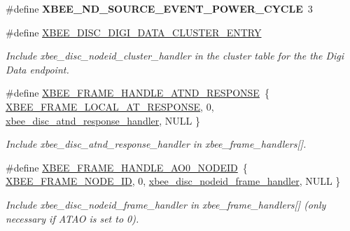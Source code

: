 \begin{DoxyCompactItemize}
\item 
\mbox{\label{group__xbee__discovery_ga0e1a51031fe5f18aa5b2c5ad02bbb329}} 
\#define {\bfseries X\+B\+E\+E\+\_\+\+N\+D\+\_\+\+S\+O\+U\+R\+C\+E\+\_\+\+E\+V\+E\+N\+T\+\_\+\+P\+O\+W\+E\+R\+\_\+\+C\+Y\+C\+LE}~3
\item 
\#define \hyperlink{group__xbee__discovery_ga8f678e29b22812632df7d3fa3d0f951a}{X\+B\+E\+E\+\_\+\+D\+I\+S\+C\+\_\+\+D\+I\+G\+I\+\_\+\+D\+A\+T\+A\+\_\+\+C\+L\+U\+S\+T\+E\+R\+\_\+\+E\+N\+T\+RY}
\begin{DoxyCompactList}\small\item\em Include xbee\+\_\+disc\+\_\+nodeid\+\_\+cluster\+\_\+handler in the cluster table for the the Digi Data endpoint. \end{DoxyCompactList}\item 
\mbox{\label{group__xbee__discovery_gadfed4daf7748e615dedf036d94d9fee9}} 
\#define \hyperlink{group__xbee__discovery_gadfed4daf7748e615dedf036d94d9fee9}{X\+B\+E\+E\+\_\+\+F\+R\+A\+M\+E\+\_\+\+H\+A\+N\+D\+L\+E\+\_\+\+A\+T\+N\+D\+\_\+\+R\+E\+S\+P\+O\+N\+SE}~\{ \hyperlink{group__xbee__device_gga7753bbebaf00d6d64942f64b6ae9b7b9ae66771334070219cd098c8201936cf4a}{X\+B\+E\+E\+\_\+\+F\+R\+A\+M\+E\+\_\+\+L\+O\+C\+A\+L\+\_\+\+A\+T\+\_\+\+R\+E\+S\+P\+O\+N\+SE}, 0, \hyperlink{group__xbee__discovery_ga6d1190133ded980a4eeca2034508c8a5}{xbee\+\_\+disc\+\_\+atnd\+\_\+response\+\_\+handler}, N\+U\+LL \}
\begin{DoxyCompactList}\small\item\em Include xbee\+\_\+disc\+\_\+atnd\+\_\+response\+\_\+handler in xbee\+\_\+frame\+\_\+handlers\mbox{[}\mbox{]}. \end{DoxyCompactList}\item 
\#define \hyperlink{group__xbee__discovery_ga11002dcf6525c8a0d1144215bebbc774}{X\+B\+E\+E\+\_\+\+F\+R\+A\+M\+E\+\_\+\+H\+A\+N\+D\+L\+E\+\_\+\+A\+O0\+\_\+\+N\+O\+D\+E\+ID}~\{ \hyperlink{group__xbee__device_gga7753bbebaf00d6d64942f64b6ae9b7b9a5b572839c3123f1059ec2ced643cf5d2}{X\+B\+E\+E\+\_\+\+F\+R\+A\+M\+E\+\_\+\+N\+O\+D\+E\+\_\+\+ID}, 0, \hyperlink{group__xbee__discovery_gac15854e05ef3f80d6ddae653065c0a40}{xbee\+\_\+disc\+\_\+nodeid\+\_\+frame\+\_\+handler}, N\+U\+LL \}
\begin{DoxyCompactList}\small\item\em Include xbee\+\_\+disc\+\_\+nodeid\+\_\+frame\+\_\+handler in xbee\+\_\+frame\+\_\+handlers\mbox{[}\mbox{]} (only necessary if A\+T\+AO is set to 0). \end{DoxyCompactList}\end{DoxyCompactItemize}
